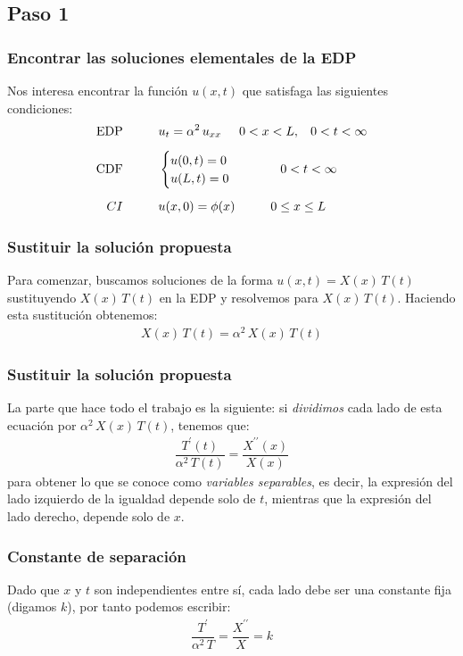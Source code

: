 \subsection{Paso 1}
\begin{frame}
\frametitle{Encontrar las soluciones elementales de la EDP}
Nos interesa encontrar la función $u(x, t)$ que satisfaga las siguientes condiciones:
\begin{align*}
\mbox{EDP} \hspace{1cm} &u_{t} = \alpha^{2} \, u_{xx} \hspace{0.5cm} 0 < x < L, \hspace{0.3cm} 0 < t < \infty \\[0.5em] 
\mbox{CDF} \hspace{1cm} &\begin{cases}
    u(0, t) = 0 \\
    u(L, t) = 0
    \end{cases}
    \hspace{1cm}
    0 < t < \infty \\[0.5em]
CI \hspace{1cm} & u(x, 0) = \phi (x) \hspace{1cm} 0 \leq x \leq L
\end{align*}
\end{frame}
\begin{frame}
\frametitle{Sustituir la solución propuesta}
Para comenzar, buscamos soluciones de la forma $u (x, t) = X(x) \, T (t)$ sustituyendo $X (x) \, T (t)$ en la EDP y resolvemos para  $X (x) \, T (t)$. Haciendo esta sustitución obtenemos:
\begin{align*}
X(x) \, T (t) = \alpha^{2} \, X (x) \, T(t)
\end{align*}
\end{frame}
\begin{frame}
\frametitle{Sustituir la solución propuesta}
La parte que hace todo el trabajo es la siguiente: si \emph{dividimos} cada lado de esta ecuación por $\alpha^{2} \, X(x) \, T(t)$, tenemos que:
\begin{align*}
\dfrac{T^{\prime} (t)}{\alpha^{2} \, T(t)} = \dfrac{X^{\prime \prime} (x)}{X(x)}
\end{align*}
para obtener lo que se conoce como \emph{variables separables}, es decir, la expresión del lado izquierdo de la igualdad depende solo de $t$, mientras que la expresión del lado derecho, depende solo de $x$.
\end{frame}
\begin{frame}
\frametitle{Constante de separación}
Dado que $x$ y $t$ son independientes entre sí, cada lado debe ser una constante fija (digamos $k$),  por tanto podemos escribir:
\begin{align*}
\dfrac{T^{\prime}}{\alpha^{2} \, T} = \dfrac{X^{\prime \prime}}{X} = k
\end{align*}
\end{frame}
